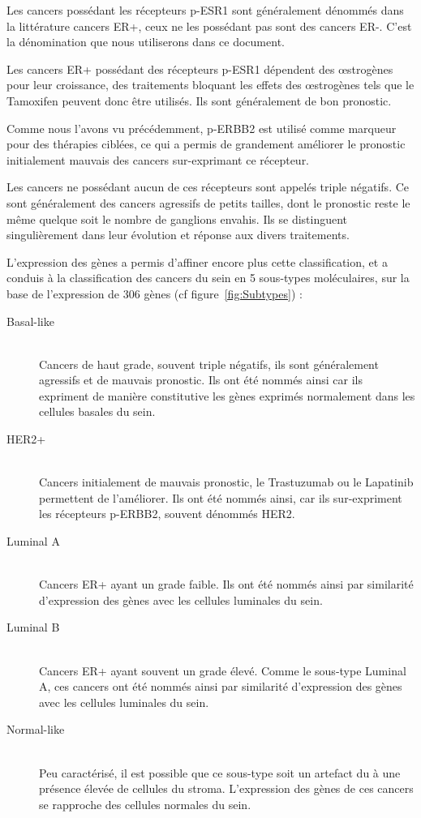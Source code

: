 			Les cancers possédant les récepteurs \acs{p-ESR1} sont généralement dénommés dans la littérature cancers \acs{ER+}, ceux ne les possédant pas sont des cancers \acs{ER-}.
			C'est la dénomination que nous utiliserons dans ce document.

			Les cancers \acs{ER+} possédant des récepteurs \acs{p-ESR1} dépendent des {\oe}strogènes pour leur croissance, des traitements bloquant les effets des {\oe}strogènes tels que le Tamoxifen peuvent donc être utilisés.
			Ils sont généralement de bon pronostic.

			Comme nous l'avons vu précédemment, \acs{p-ERBB2} est utilisé comme marqueur pour des thérapies ciblées, ce qui a permis de grandement améliorer le pronostic initialement mauvais des cancers sur-exprimant ce récepteur.

			Les cancers ne possédant aucun de ces récepteurs sont appelés triple négatifs.
			Ce sont généralement des cancers agressifs de petits tailles, dont le pronostic reste le même quelque soit le nombre de ganglions envahis.
			Ils se distinguent singulièrement dans leur évolution et réponse aux divers traitements.

			L'expression des gènes a permis d'affiner encore plus cette classification, et a conduis à la classification des cancers du sein en 5 sous-types moléculaires, sur la base de l'expression de 306 gènes \citep{Perou2000,Sorlie2001} (cf figure~\ref{fig:Subtypes}) :
			\begin{description}
			\item [Basal-like]  \hfill \\
				Cancers de haut grade, souvent triple négatifs, ils sont généralement agressifs et de mauvais pronostic.
				Ils ont été nommés ainsi car ils expriment de manière constitutive les gènes exprimés normalement dans les cellules basales du sein.
			\item [\acs{HER2+}] \hfill \\
				Cancers initialement de mauvais pronostic, le Trastuzumab ou le Lapatinib permettent de l'améliorer.
				Ils ont été nommés ainsi, car ils sur-expriment les récepteurs \acs{p-ERBB2}, souvent dénommés \acs{HER2}.
			\item [Luminal A]   \hfill \\
				Cancers \acs{ER+} ayant un grade faible.
				Ils ont été nommés ainsi par similarité d'expression des gènes avec les cellules luminales du sein.
			\item [Luminal B]   \hfill \\
				Cancers \acs{ER+} ayant souvent un grade élevé.
				Comme le sous-type Luminal A, ces cancers ont été nommés ainsi par similarité d'expression des gènes avec les cellules luminales du sein.
			\item [Normal-like] \hfill \\
				Peu caractérisé, il est possible que ce sous-type soit un artefact du à une présence élevée de cellules du stroma.
				L'expression des gènes de ces cancers se rapproche des cellules normales du sein.
			\end{description}


